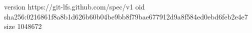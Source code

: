version https://git-lfs.github.com/spec/v1
oid sha256:0216861f8a8b1d626b60b04be9bb8f79bae677912d9a8f584ed0ebd6feb2e4e7
size 1048672
